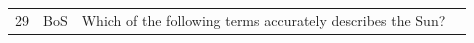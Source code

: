 \documentclass[10pt]{article}
\begin{document}
\begin{tiny}
\begin{longtable}{|r|p{0.375in}|p{1.275in}|p{3.5in}|}
29 &          BoS &                                                                                                                                                                                                                       Which of the following terms accurately describes the Sun? &                                                                                                                                                                                                                                                                                                                                                                                                                                                                                                                                                                                                                                                                                                                                                                                                                                                                                                                                                                                                                                                                                                                                                                                                                                                                                                                                                                                                                                                                                                                                                                                                                                                                                                                                                                                                                                                                                                                                                                                                                                                                                                                                                                                                                                                                                                                                                                                                                                                                                                                                                                                                                                                                                                                                                                                                                                                                                                                                                                                                                                                                                               
\end{longtable}
\end{tiny}
\end{document}
